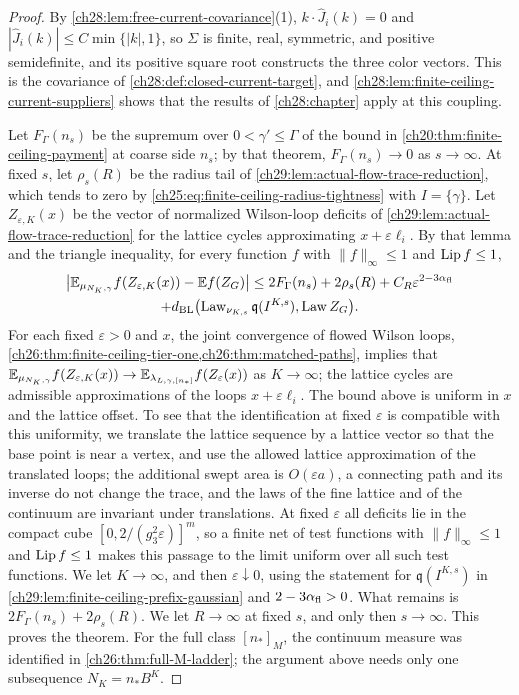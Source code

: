 \begin{proof}
By \cref{ch28:lem:free-current-covariance}(1), $k\cdot\widehat J_i(k)=0$ and $|\widehat J_i(k)|\le C\min\{|k|,1\}$, so $\Sigma$ is finite, real, symmetric, and positive semidefinite, and its positive square root constructs the three color vectors. This is the covariance of \cref{ch28:def:closed-current-target}, and \cref{ch28:lem:finite-ceiling-current-suppliers} shows that the results of \cref{ch28:chapter} apply at this coupling.

Let $F_\Gamma(n_s)$ be the supremum over $0<\gamma'\le\Gamma$ of the bound in \cref{ch20:thm:finite-ceiling-payment} at coarse side $n_s$; by that theorem, $F_\Gamma(n_s)\to0$ as $s\to\infty$. At fixed $s$, let $\rho_s(R)$ be the radius tail of \cref{ch29:lem:actual-flow-trace-reduction}, which tends to zero by \eqref{ch25:eq:finite-ceiling-radius-tightness} with $I=\{\gamma\}$. Let $Z_{\varepsilon,K}(x)$ be the vector of normalized Wilson-loop deficits of \cref{ch29:lem:actual-flow-trace-reduction} for the lattice cycles approximating $x+\varepsilon\ell_i$. By that lemma and the triangle inequality, for every function $f$ with $\|f\|_\infty\le1$ and $\operatorname{Lip} f\le1$,
\begin{multline*}
 \bigl|\mathbb E_{\mu_{N_K,\gamma}}f(Z_{\varepsilon,K}(x))-\mathbb E f(Z_G)\bigr|\le2F_\Gamma(n_s)+2\rho_s(R)+C_R\varepsilon^{2-3\alpha_{\mathrm{fl}}}\\
 +d_{\mathrm{BL}}\bigl(\operatorname{Law}_{\nu_{K,s}}\mathfrak q(I^{K,s}),\operatorname{Law} Z_G\bigr).
\end{multline*}
For each fixed $\varepsilon>0$ and $x$, the joint convergence of flowed Wilson loops, \cref{ch26:thm:finite-ceiling-tier-one,ch26:thm:matched-paths}, implies that $\mathbb E_{\mu_{N_K,\gamma}}f(Z_{\varepsilon,K}(x))\to\mathbb E_{\lambda_{L,\gamma,[n_*]}}f(Z_\varepsilon(x))$ as $K\to\infty$; the lattice cycles are admissible approximations of the loops $x+\varepsilon\ell_i$. The bound above is uniform in $x$ and the lattice offset. To see that the identification at fixed $\varepsilon$ is compatible with this uniformity, we translate the lattice sequence by a lattice vector so that the base point is near a vertex, and use the allowed lattice approximation of the translated loops; the additional swept area is $O(\varepsilon a)$, a connecting path and its inverse do not change the trace, and the laws of the fine lattice and of the continuum are invariant under translations. At fixed $\varepsilon$ all deficits lie in the compact cube $[0,2/(g_3^2\varepsilon)]^m$, so a finite net of test functions with $\|f\|_\infty\le1$ and $\operatorname{Lip} f\le1$ makes this passage to the limit uniform over all such test functions. We let $K\to\infty$, and then $\varepsilon\downarrow0$, using the statement for $\mathfrak q(I^{K,s})$ in \cref{ch29:lem:finite-ceiling-prefix-gaussian} and $2-3\alpha_{\mathrm{fl}}>0$. What remains is $2F_\Gamma(n_s)+2\rho_s(R)$. We let $R\to\infty$ at fixed $s$, and only then $s\to\infty$. This proves the theorem. For the full class $[n_*]_M$, the continuum measure was identified in \cref{ch26:thm:full-M-ladder}; the argument above needs only one subsequence $N_K=n_*B^K$.
\end{proof}

